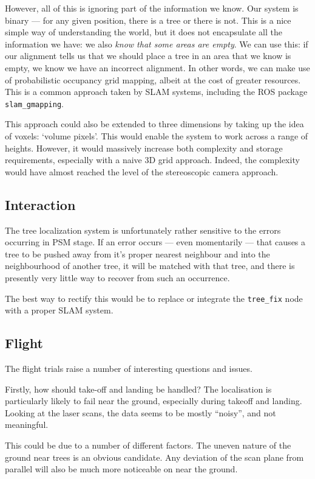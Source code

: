 \documentclass[12pt,oneside,a4paper,draft]{book}
\begin{document}
However, all of this is ignoring part of the information we know. Our
system is binary --- for any given position, there is a tree or there
is not. This is a nice simple way of understanding the world, but it
does not encapsulate all the information we have: we also \emph{know
  that some areas are empty}. We can use this: if our alignment tells
us that we should place a tree in an area that we know is empty, we
know we have an incorrect alignment. In other words, we can make use
of probabilistic occupancy grid mapping, albeit at the cost of greater
resources. This is a common approach taken by SLAM systems, including
the ROS package \texttt{slam\_gmapping}.

This approach could also be extended to three dimensions by taking up
the idea of voxels: `volume pixels'. This would enable the system to
work across a range of heights. However, it would massively increase
both complexity and storage requirements, especially with a naive 3D
grid approach. Indeed, the complexity would have almost reached the
level of the stereoscopic camera approach.


\subsection{Interaction}
\label{sec:interaction}

The tree localization system is unfortunately rather sensitive to the
errors occurring in PSM stage. If an error occurs --- even momentarily
--- that causes a tree to be pushed away from it's proper nearest
neighbour and into the neighbourhood of another tree, it will be
matched with that tree, and there is presently very little way to
recover from such an occurrence.

The best way to rectify this would be to replace or integrate the
\texttt{tree\_fix} node with a proper SLAM system.

\subsection{Flight}
\label{sec:flight}

The flight trials raise a number of interesting questions and issues.

Firstly, how should take-off and landing be handled? The localisation
is particularly likely to fail near the ground, especially during
takeoff and landing. Looking at the laser scans, the data seems to be
mostly ``noisy'', and not meaningful.

This could be due to a number of different factors. The uneven nature
of the ground near trees is an obvious candidate. Any deviation of the
scan plane from parallel will also be much more noticeable on near the
ground.
\end{document}
